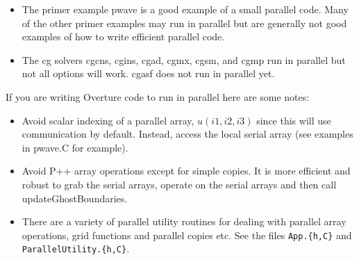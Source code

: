 \documentclass{article}
\begin{document}
\begin{itemize}
  \item The primer example pwave is a good example of a small parallel code. Many of the
        other primer examples may run in parallel but are generally not good examples of how to write efficient
        parallel code.
  \item The cg solvers cgcns, cgins, cgad, cgmx, cgsm, and cgmp run in parallel but not all options will work. 
        cgasf does not run in parallel yet. 
\end{itemize}


 If you are writing Overture code to run in parallel here are some notes:
\begin{itemize}
  \item Avoid scalar indexing of a parallel array, $u(i1,i2,i3)$ since this will use communication by default.
        Instead, access the local serial array (see examples in pwave.C for example). 
  \item Avoid P++ array operations except for simple copies.  It is more efficient and robust to grab the serial
        arrays, operate on the serial arrays and then call updateGhostBoundaries. 
  \item There are a variety of parallel utility routines for dealing with parallel array operations,
        grid functions and parallel copies etc. See the files {\tt App.\{h,C\}} and {\tt ParallelUtility.\{h,C\}}.
\end{itemize}
\end{document}
